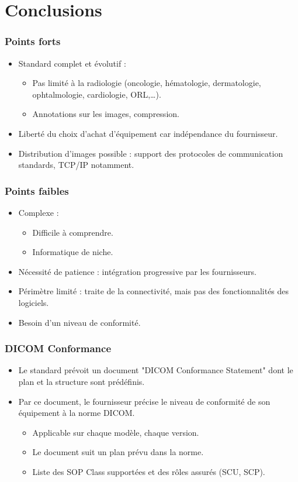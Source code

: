 \section{Conclusions}

\frame
{
	\frametitle{Points forts}
	\begin{itemize}
		\item Standard complet et \'evolutif :
		\begin{itemize}
			\item Pas limit\'e \`a la radiologie (oncologie, h\'ematologie, dermatologie, ophtalmologie, cardiologie, ORL,\ldots).
			\item Annotations sur les images, compression.
		\end{itemize}
		\item Libert\'e du choix d'achat d'\'equipement car ind\'ependance du fournisseur.
		\item Distribution d'images possible : support des protocoles de communication standards, TCP/IP notamment.
	\end{itemize}
}

\frame
{
	\frametitle{Points faibles}
	\begin{itemize}
		\item Complexe :
		\begin{itemize}
			\item Difficile \`a comprendre.
			\item Informatique de niche.
		\end{itemize}
		\item N\'ecessit\'e de patience : int\'egration progressive par les fournisseurs.
		\item P\'erim\`etre limit\'e : traite de la connectivit\'e, mais pas des fonctionnalit\'es des logiciels.
		\item Besoin d'un niveau de conformit\'e.
	\end{itemize}
}

\frame
{
	\frametitle{DICOM Conformance}
	\begin{itemize}
		\item Le standard pr\'evoit un document "DICOM Conformance Statement" dont le plan et la structure sont pr\'ed\'efinis.
		\item Par ce document, le fournisseur pr\'ecise le niveau de conformit\'e de son \'equipement \`a la norme DICOM.
		\begin{itemize}
			\item Applicable sur chaque mod\`ele, chaque version.
			\item Le document suit un plan pr\'evu dans la norme.
			\item Liste des SOP Class support\'ees et des r\^oles assur\'es (SCU, SCP).
		\end{itemize}
	\end{itemize}
}


